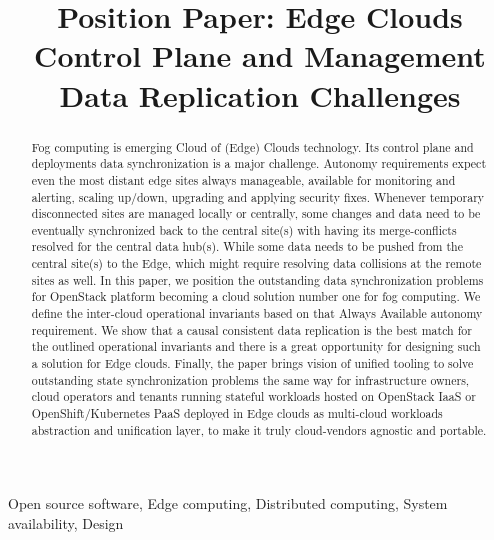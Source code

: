 \documentclass[conference]{IEEEtran}
\begin{document}
\title{Position Paper: Edge Clouds Control Plane and Management Data
Replication Challenges\\
}

\author{
}

\maketitle

\begin{abstract}
Fog computing is emerging Cloud of (Edge) Clouds technology. Its control
plane and deployments data synchronization is a major challenge. Autonomy
requirements expect even the most distant edge sites always manageable,
available for monitoring and alerting, scaling up/down, upgrading and
applying security fixes. Whenever temporary disconnected sites are managed
locally or centrally, some changes and data need to be eventually
synchronized back to the central site(s) with having its merge-conflicts
resolved for the central data hub(s). While some data needs to be pushed from
the central site(s) to the Edge, which might require resolving data
collisions at the remote sites as well. In this paper, we position the
outstanding data synchronization problems for OpenStack platform becoming a
cloud solution number one for fog computing. We define the inter-cloud
operational invariants based on that Always Available autonomy requirement.
We show that a causal consistent data replication is the best match for the
outlined operational invariants and there is a great opportunity for
designing such a solution for Edge clouds. Finally, the paper brings vision
of unified tooling to solve outstanding state synchronization problems the
same way for infrastructure owners, cloud operators and tenants running
stateful workloads hosted on OpenStack IaaS or OpenShift/Kubernetes PaaS
deployed in Edge clouds as multi-cloud workloads abstraction and unification
layer, to make it truly cloud-vendors agnostic and portable.
\end{abstract}

\begin{IEEEkeywords}
Open source software, Edge computing, Distributed computing, System
availability, Design
\end{IEEEkeywords}
\end{document}
